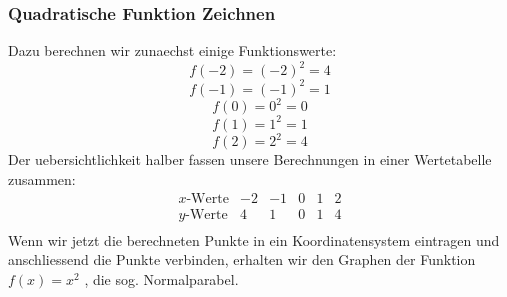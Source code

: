 \begin{multicols}{2}
    \subsubsection{Quadratische Funktion Zeichnen}
    \vspace{-4mm}
    Dazu berechnen wir zunaechst einige Funktionswerte:
    \[f(-2) = (-2)^2 = 4\]
    \[f(-1) = (-1)^2 = 1\]
    \[f(0) = 0^2 = 0\]
    \[f(1) = 1^2 = 1\]
    \[f(2) = 2^2 = 4\]
    Der uebersichtlichkeit halber fassen unsere Berechnungen in einer Wertetabelle zusammen:
    \[ \begin{array}{r|c|c|c|c|c} x\text{-Werte} & -2 & -1 & 0 & 1 & 2 \\ \hline y\text{-Werte} & 4 & 1 & 0 & 1 & 4 \\ \end{array}\]
    Wenn wir jetzt die berechneten Punkte in ein Koordinatensystem eintragen und anschliessend die Punkte verbinden, erhalten wir den Graphen der Funktion $f(x)=x^2$ , die sog. Normalparabel.


\end{multicols}
